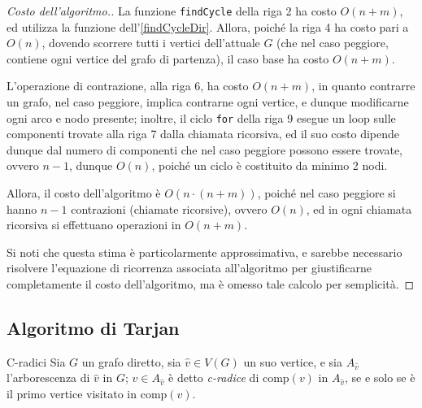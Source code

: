 \documentclass[a4paper, 12pt]{report}
\begin{document}
    \begin{proof}[Costo dell'algoritmo.]
        La funzione \texttt{findCycle} della riga 2 ha costo $O(n + m)$, ed utilizza la funzione dell'\cref{findCycleDir}. Allora, poiché la riga 4 ha costo pari a $O(n)$, dovendo scorrere tutti i vertici dell'attuale $G$ (che nel caso peggiore, contiene ogni vertice del grafo di partenza), il caso base ha costo $O(n+ m)$.

        L'operazione di contrazione, alla riga 6, ha costo $O(n+m)$, in quanto contrarre un grafo, nel caso peggiore, implica contrarne ogni vertice, e dunque modificarne ogni arco e nodo presente; inoltre, il ciclo \texttt{for} della riga 9 esegue un loop sulle componenti trovate alla riga 7 dalla chiamata ricorsiva, ed il suo costo dipende dunque dal numero di componenti che nel caso peggiore possono essere trovate, ovvero $n - 1$, dunque $O(n)$, poiché un ciclo è costituito da minimo 2 nodi.

        Allora, il costo dell'algoritmo è $O(n \cdot (n + m))$, poiché nel caso peggiore si hanno $n - 1$ contrazioni (chiamate ricorsive), ovvero $O(n)$, ed in ogni chiamata ricorsiva si effettuano operazioni in $O(n + m)$.

        Si noti che questa stima è particolarmente approssimativa, e sarebbe necessario risolvere l'equazione di ricorrenza associata all'algoritmo per giustificarne completamente il costo dell'algoritmo, ma è omesso tale calcolo per semplicità.
    \end{proof}

    \subsection{Algoritmo di Tarjan}

    \begin{frameddefn}{C-radici}
        Sia $G$ un grafo diretto, sia $\hat v \in V(G)$ un suo vertice, e sia $A_{\hat v}$ l'arborescenza di $\hat v$ in $G$; $v \in A_{\hat v}$ è detto \textit{c-radice} di $\mathrm{comp}(v)$ in $A_{\hat v}$, se e solo se è il primo vertice visitato in $\mathrm{comp}(v)$.
    \end{frameddefn}
\end{document}

